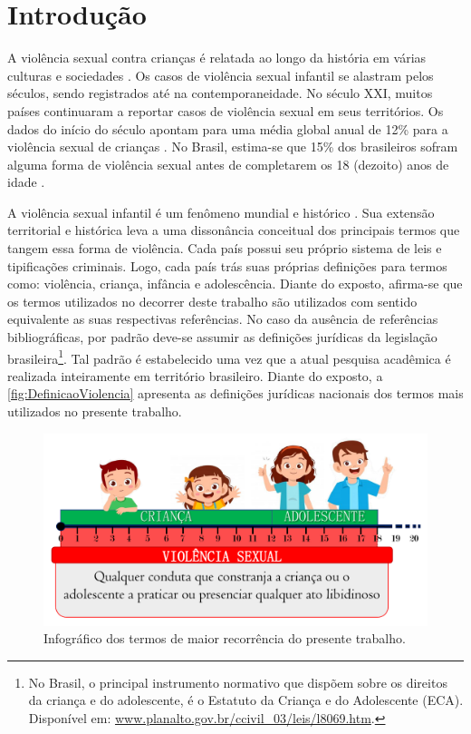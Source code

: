 \chapter{Introdução}\label{ch:Introducao}

A violência sexual contra crianças é relatada ao longo da história em várias culturas e sociedades \cite{walker1988physically, aded2006abuso}. Os casos de violência sexual infantil se alastram pelos séculos, sendo registrados até na contemporaneidade. No século XXI, muitos países continuaram a reportar casos de violência sexual em seus territórios. Os dados do início do século apontam para uma média global anual de 12\% para a violência sexual de crianças \cite{stoltenborgh2011global, azzopardi2019meta}. No Brasil, estima-se que 15\% dos brasileiros sofram alguma forma de violência sexual antes de completarem os 18 (dezoito) anos de idade .

A violência sexual infantil é um fenômeno mundial e histórico \cite{pinto2017avaliaccao}. Sua extensão territorial e histórica leva a uma dissonância conceitual dos principais termos que tangem essa forma de violência. Cada país possui seu próprio sistema de leis e tipificações criminais. Logo, cada país trás suas próprias definições para termos como: violência, criança, infância e adolescência. Diante do exposto, afirma-se que os termos utilizados no decorrer deste trabalho são utilizados com sentido equivalente as suas respectivas referências. No caso da ausência de referências bibliográficas, por padrão deve-se assumir as definições jurídicas da legislação brasileira\footnote{No Brasil, o principal instrumento normativo que dispõem sobre os direitos da criança e do adolescente, é o Estatuto da Criança e do Adolescente (ECA). Disponível em: \url{www.planalto.gov.br/ccivil_03/leis/l8069.htm}.}. Tal padrão é estabelecido uma vez que a atual pesquisa acadêmica é realizada inteiramente em território brasileiro. Diante do exposto, a \autoref{fig:DefinicaoViolencia} apresenta as definições jurídicas nacionais dos termos mais utilizados no presente trabalho.

\begin{figure}[!h]
	\centering
	\caption{Infográfico dos termos de maior recorrência do presente trabalho.}\label{fig:DefinicaoViolencia}
	\vspace{0.5cm}
	\includegraphics[width=\textwidth]{./Visuais/DefinicaoViolencia.pdf}
\end{figure}

